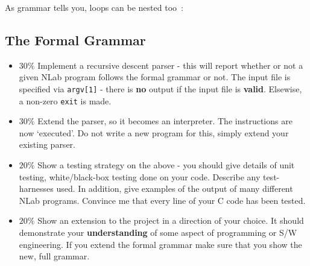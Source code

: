

As grammar tells you, loops can be nested too~:




\subsection*{The Formal Grammar}


\begin{exercise}
\begin{itemize}
\item {\bf $30\%$}
Implement a recursive descent parser - this will report
whether or not a given NLab program follows the formal grammar or not.
The input file is specified via \verb^argv[1]^ - there is {\bf no} output if
the input file is {\bf valid}. Elsewise, a non-zero \verb^exit^ is made.

\item {\bf $30\%$}
Extend the parser, so it becomes an interpreter. The instructions are
now `executed'. Do not write a new program for this, simply extend your
existing parser.

\item {\bf $20\%$}
Show a testing strategy on the above -
you should give details of
unit testing, white/black-box testing done on your code. Describe any
test-harnesses used. In addition, give examples of the output of many different
NLab programs. Convince me that every line of your C code
has been tested.

\item {\bf $20\%$}
Show an extension to the project in a direction of
your choice. It should demonstrate your {\bf understanding} of some aspect
of programming or S/W engineering. If you extend the formal grammar
make sure that you show the new, full grammar.
\end{itemize}


\end{exercise}
